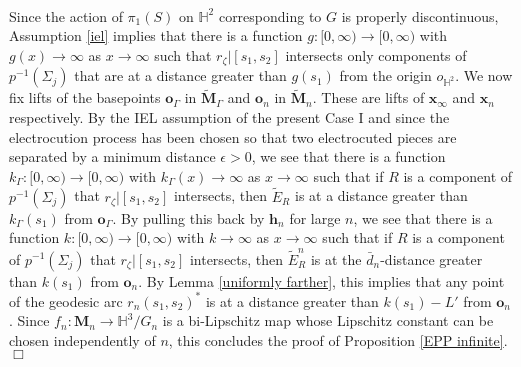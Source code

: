\documentclass{amsart}
\newtheorem{lemma}[theorem]{Lemma}
\theoremstyle{definition}
\newcommand\HHH{{\mathbb H}}
\begin{document}
\\
Since the action of $\pi_1(S)$ on $\HHH^2$ corresponding to $G$ is properly discontinuous, Assumption \ref{iel} implies that there is a function $g\colon [0,\infty) \to [0,\infty)$ with $g(x) \to \infty$ as $x \rightarrow \infty$ such that $r_\zeta|[s_1,s_2]$ intersects only components of $p^{-1}(\Sigma_j)$ that are at a distance greater than $g(s_1)$ from the origin $o_{\HHH^2}$.
We now fix lifts of the basepoints $\mathbf o_\Gamma$ in $\widetilde{\mathbf M}_\Gamma$ and $\mathbf o_n$ in $\widetilde{\mathbf M}_n$. These are lifts of $\mathbf x_\infty$ and $\mathbf x_n$ respectively.
By the IEL assumption of the present Case I and since the electrocution process has been chosen so that two electrocuted pieces are separated by a minimum distance $\epsilon>0$, we  see that there is a function $k_\Gamma\colon [0,\infty) \rightarrow [0,\infty)$ with $k_\Gamma(x) \to \infty$ as $x\to \infty$ such that if $R$ is a component of $p^{-1}(\Sigma_j)$ that $r_\zeta|[s_1, s_2]$ intersects, then $\widetilde E_R$ is at a distance greater than $k_\Gamma(s_1)$ from $\mathbf o_\Gamma$.
By pulling this back by $\mathbf h_n$ for large $n$, we see that there is a function $k : [0,\infty) \rightarrow [0,\infty)$ with $k \to \infty$ as $x\to \infty$ such that if $R$ is a component of $p^{-1}(\Sigma_j)$ that $r_\zeta|[s_1,s_2]$ intersects, then $\widetilde E^n_R$ is at the  $\bar d_n$-distance greater than $k(s_1)$ from $\mathbf o_n$.
By Lemma \ref{uniformly farther}, this implies that any point of the geodesic arc  $r_n(s_1, s_2)^*$ is at a distance greater than $k(s_1)-L'$ from $\mathbf o_n$.
Since $f_n\colon \mathbf M_n \to \HHH^3/G_n$ is a  bi-Lipschitz map whose Lipschitz constant can be chosen independently of $n$,
this concludes the proof of Proposition \ref{EPP infinite}.
$\Box$
%
\end{document}
